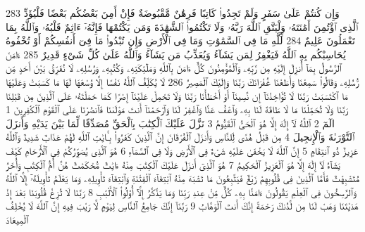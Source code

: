 {\tiny\colorbox{cl_aya}{283}} وَإِن كُنتُمْ عَلَىٰ سَفَرٍ وَلَمْ تَجِدُوا۟ كَاتِبًا فَرِهَٰنٌ مَّقْبُوضَةٌ فَإِنْ أَمِنَ بَعْضُكُم بَعْضًا فَلْيُؤَدِّ ٱلَّذِى ٱؤْتُمِنَ أَمَٰنَتَهُۥ وَلْيَتَّقِ ٱللَّهَ رَبَّهُۥ وَلَا تَكْتُمُوا۟ ٱلشَّهَٰدَةَ وَمَن يَكْتُمْهَا فَإِنَّهُۥٓ ءَاثِمٌ قَلْبُهُۥ وَٱللَّهُ بِمَا تَعْمَلُونَ عَلِيمٌ
{\tiny\colorbox{cl_aya}{284}} لِّلَّهِ مَا فِى ٱلسَّمَٰوَٰتِ وَمَا فِى ٱلْأَرْضِ وَإِن تُبْدُوا۟ مَا فِىٓ أَنفُسِكُمْ أَوْ تُخْفُوهُ يُحَاسِبْكُم بِهِ ٱللَّهُ فَيَغْفِرُ لِمَن يَشَآءُ وَيُعَذِّبُ مَن يَشَآءُ وَٱللَّهُ عَلَىٰ كُلِّ شَىْءٍ قَدِيرٌ
{\tiny\colorbox{cl_aya}{285}} ءَامَنَ ٱلرَّسُولُ بِمَآ أُنزِلَ إِلَيْهِ مِن رَّبِّهِۦ وَٱلْمُؤْمِنُونَ كُلٌّ ءَامَنَ بِٱللَّهِ وَمَلَٰٓئِكَتِهِۦ وَكُتُبِهِۦ وَرُسُلِهِۦ لَا نُفَرِّقُ بَيْنَ أَحَدٍ مِّن رُّسُلِهِۦ وَقَالُوا۟ سَمِعْنَا وَأَطَعْنَا غُفْرَانَكَ رَبَّنَا وَإِلَيْكَ ٱلْمَصِيرُ
{\tiny\colorbox{cl_aya}{286}} لَا يُكَلِّفُ ٱللَّهُ نَفْسًا إِلَّا وُسْعَهَا لَهَا مَا كَسَبَتْ وَعَلَيْهَا مَا ٱكْتَسَبَتْ رَبَّنَا لَا تُؤَاخِذْنَآ إِن نَّسِينَآ أَوْ أَخْطَأْنَا رَبَّنَا وَلَا تَحْمِلْ عَلَيْنَآ إِصْرًا كَمَا حَمَلْتَهُۥ عَلَى ٱلَّذِينَ مِن قَبْلِنَا رَبَّنَا وَلَا تُحَمِّلْنَا مَا لَا طَاقَةَ لَنَا بِهِۦ وَٱعْفُ عَنَّا وَٱغْفِرْ لَنَا وَٱرْحَمْنَآ أَنتَ مَوْلَىٰنَا فَٱنصُرْنَا عَلَى ٱلْقَوْمِ ٱلْكَٰفِرِينَ
{\tiny\colorbox{cl_aya}{1}} الٓمٓ
{\tiny\colorbox{cl_aya}{2}} ٱللَّهُ لَآ إِلَٰهَ إِلَّا هُوَ ٱلْحَىُّ ٱلْقَيُّومُ
{\tiny\colorbox{cl_aya}{3}} نَزَّلَ عَلَيْكَ ٱلْكِتَٰبَ بِٱلْحَقِّ مُصَدِّقًا لِّمَا بَيْنَ يَدَيْهِ وَأَنزَلَ ٱلتَّوْرَىٰةَ وَٱلْإِنجِيلَ
{\tiny\colorbox{cl_aya}{4}} مِن قَبْلُ هُدًى لِّلنَّاسِ وَأَنزَلَ ٱلْفُرْقَانَ إِنَّ ٱلَّذِينَ كَفَرُوا۟ بِـَٔايَٰتِ ٱللَّهِ لَهُمْ عَذَابٌ شَدِيدٌ وَٱللَّهُ عَزِيزٌ ذُو ٱنتِقَامٍ
{\tiny\colorbox{cl_aya}{5}} إِنَّ ٱللَّهَ لَا يَخْفَىٰ عَلَيْهِ شَىْءٌ فِى ٱلْأَرْضِ وَلَا فِى ٱلسَّمَآءِ
{\tiny\colorbox{cl_aya}{6}} هُوَ ٱلَّذِى يُصَوِّرُكُمْ فِى ٱلْأَرْحَامِ كَيْفَ يَشَآءُ لَآ إِلَٰهَ إِلَّا هُوَ ٱلْعَزِيزُ ٱلْحَكِيمُ
{\tiny\colorbox{cl_aya}{7}} هُوَ ٱلَّذِىٓ أَنزَلَ عَلَيْكَ ٱلْكِتَٰبَ مِنْهُ ءَايَٰتٌ مُّحْكَمَٰتٌ هُنَّ أُمُّ ٱلْكِتَٰبِ وَأُخَرُ مُتَشَٰبِهَٰتٌ فَأَمَّا ٱلَّذِينَ فِى قُلُوبِهِمْ زَيْغٌ فَيَتَّبِعُونَ مَا تَشَٰبَهَ مِنْهُ ٱبْتِغَآءَ ٱلْفِتْنَةِ وَٱبْتِغَآءَ تَأْوِيلِهِۦ وَمَا يَعْلَمُ تَأْوِيلَهُۥٓ إِلَّا ٱللَّهُ وَٱلرَّٰسِخُونَ فِى ٱلْعِلْمِ يَقُولُونَ ءَامَنَّا بِهِۦ كُلٌّ مِّنْ عِندِ رَبِّنَا وَمَا يَذَّكَّرُ إِلَّآ أُو۟لُوا۟ ٱلْأَلْبَٰبِ
{\tiny\colorbox{cl_aya}{8}} رَبَّنَا لَا تُزِغْ قُلُوبَنَا بَعْدَ إِذْ هَدَيْتَنَا وَهَبْ لَنَا مِن لَّدُنكَ رَحْمَةً إِنَّكَ أَنتَ ٱلْوَهَّابُ
{\tiny\colorbox{cl_aya}{9}} رَبَّنَآ إِنَّكَ جَامِعُ ٱلنَّاسِ لِيَوْمٍ لَّا رَيْبَ فِيهِ إِنَّ ٱللَّهَ لَا يُخْلِفُ ٱلْمِيعَادَ
